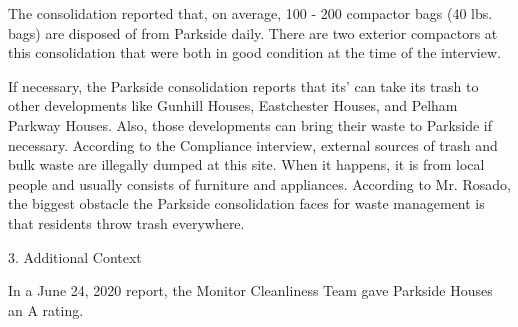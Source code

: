 The consolidation reported that, on average, 100 -  200 compactor bags (40 lbs. bags) are disposed of from Parkside daily. There are two exterior compactors at this consolidation that were both in good condition at the time of the interview. 

If necessary, the Parkside consolidation reports that its' can take its trash to other developments like Gunhill Houses, Eastchester Houses, and Pelham Parkway Houses. Also, those developments can bring their waste to Parkside if necessary. According to the Compliance interview, external sources of trash and bulk waste are illegally dumped at this site. When it happens, it is from local people and usually consists of furniture and appliances. According to Mr. Rosado, the biggest obstacle the Parkside consolidation faces for waste management is that residents throw trash everywhere.  

3. Additional Context 

In a June 24, 2020 report, the Monitor Cleanliness Team gave Parkside Houses an A rating.